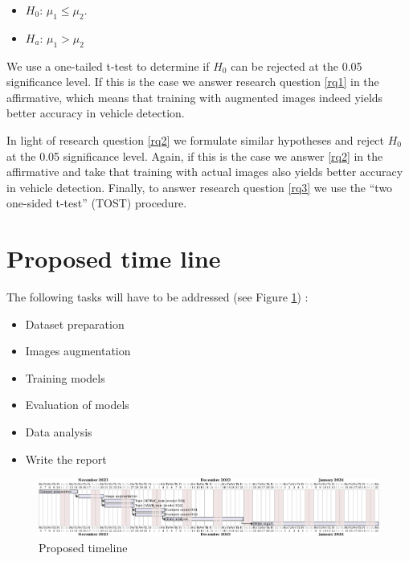 \documentclass[]{article}
\begin{document}
	\begin{itemize}
		\item $H_0$: $\mu_1 \le \mu_2$. 
		\item $H_a$: $\mu_1 > \mu_2$
	\end{itemize}
	
	We use a one-tailed t-test to determine if $H_0$ can be rejected at the 0.05 significance level. If this is the case we answer research question \ref{rq1} in the affirmative, which means that training with augmented images indeed yields better accuracy in vehicle detection. 
	
	In light of research question \ref{rq2} we formulate similar hypotheses and reject $H_0$ at the 0.05 significance level. Again, if this is the case we answer \ref{rq2} in the affirmative and take that training with actual images also yields better accuracy in vehicle detection.
	Finally, to answer research question \ref{rq3} we use the ``two one-sided t-test'' (TOST) procedure.

\section{Proposed time line}

The following tasks will have to be addressed (see Figure \ref{fig:timeline}) :
\begin{itemize}
	\item Dataset preparation
	\item Images augmentation
	\item Training models
	\item Evaluation of models
	\item Data analysis
	\item Write the report
\end{itemize}

\begin{figure}[H]
	\centering
	\includegraphics[width=\textwidth]{proposal-timing}
	\caption{Proposed timeline}
	\label{fig:timeline}
\end{figure}

\printbibliography
\end{document}
